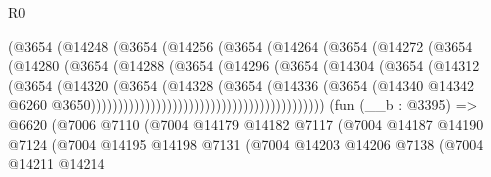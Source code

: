 \begin{lexlean}{R0}
\begin{coremodule}
                                      (@3654
                                        (@14248
                                          (@3654
                                            (@14256
                                              (@3654
                                                (@14264
                                                  (@3654
                                                    (@14272
                                                      (@3654
                                                        (@14280
                                                          (@3654
                                                            (@14288
                                                              (@3654
                                                                (@14296
                                                                  (@3654
                                                                    (@14304
                                                                      (@3654
                                                                        (@14312
                                                                          (@3654
                                                                            (@14320
                                                                              (@3654
                                                                                (@14328
                                                                                  (@3654
                                                                                    (@14336
                                                                                      (@3654
                                                                                        (@14340
                                                                                          @14342
                                                                                          @6260
                                                                                          @3650)))))))))))))))))))))))))))))))))))))))))))
    (fun (__b : @3395) =>
    @6620
      (@7006
        @7110
        (@7004
          @14179
          @14182
          @7117
          (@7004
            @14187
            @14190
            @7124
            (@7004
              @14195
              @14198
              @7131
              (@7004
                @14203
                @14206
                @7138
                (@7004
                  @14211
                  @14214

\end{coremodule}
\end{lexlean}
